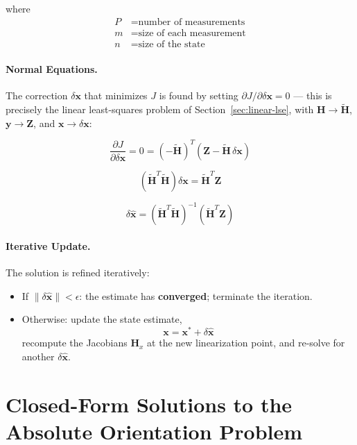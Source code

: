 \documentclass{article}
\newcommand{\vect}[1]{\mathbf{#1}}
\newcommand{\mat}[1]{\mathbf{#1}}
\newcommand{\stateVec}{\vect{x}}
\newcommand{\dstate}{\delta\vect{x}}
\newcommand{\dstateHat}{\delta\hat{\vect{x}}}
\newcommand{\Jac}{\mat{H}_x} %
\newcommand{\stackJac}{\tilde{\mat{H}}} %
\newcommand{\stackMeas}{\vect{Z}} %
\begin{document}
where
\begin{align}
    P &= \text{number of measurements} \\
    m &= \text{size of each measurement} \\
    n &= \text{size of the state}
\end{align}

\paragraph{Normal Equations.} The correction $\dstate$ that minimizes $J$ is found by setting $\partial J / \partial \dstate = 0$ --- this is precisely the linear least-squares problem of Section~\ref{sec:linear-lse}, with $\mat{H}\to\stackJac$, $\vect{y}\to\stackMeas$, and $\vect{x}\to\dstate$:

\begin{equation}
    \frac{\partial J}{\partial \dstate} = 0 = \left( -\stackJac \right)^T \left( \stackMeas - \stackJac \, \dstate \right)
\end{equation}

\begin{equation}
    \left( \stackJac^T \stackJac \right) \dstate = \stackJac^T \stackMeas
\end{equation}

\begin{equation}
    \dstateHat = \left( \stackJac^T \stackJac \right)^{-1} \left( \stackJac^T \stackMeas \right)
\end{equation}

\paragraph{Iterative Update.} The solution is refined iteratively:

\begin{itemize}
    \item If $\| \dstateHat \| < \epsilon$: the estimate has \textbf{converged}; terminate the iteration.
    \item Otherwise: update the state estimate,
    \begin{equation}
        \stateVec = \stateVec^* + \dstateHat
    \end{equation}
    recompute the Jacobians $\Jac$ at the new linearization point, and re-solve for another $\dstateHat$.
\end{itemize}

\newpage
\section{Closed-Form Solutions to the Absolute Orientation Problem}
\label{sec:closed-form}
\end{document}
